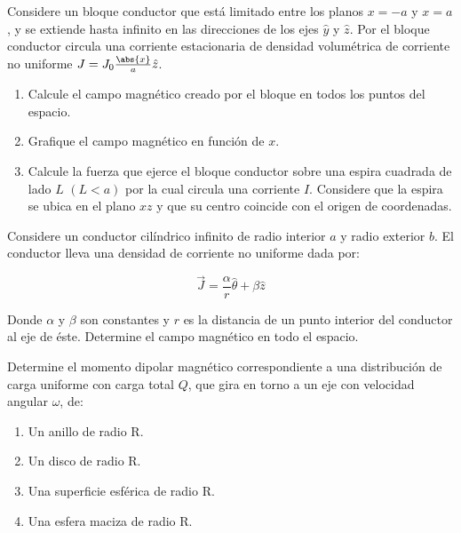 
\bigbreak

\np 
Considere un bloque conductor que está limitado entre los planos $x = -a$ y $x = a$, y se extiende hasta inﬁnito en las direcciones de los ejes $\hat{y}$ y $\hat{z}$. Por el bloque conductor circula una corriente estacionaria de densidad volumétrica de corriente no uniforme $J = J_0\frac{\abs{x}}{a}\hat{z}$.

\begin{enumerate}[label=\alph*)]
	\item Calcule el campo magnético creado por el bloque en todos los puntos del espacio.

	\item Graﬁque el campo magnético en función de $x$.

	\item Calcule la fuerza que ejerce el bloque conductor sobre una espira cuadrada de lado $L$ $(L < a)$ por la cual circula una corriente $I$. Considere que la espira se ubica en el plano $xz$ y que su centro coincide con el origen de coordenadas.
\end{enumerate}

\newpage

\np
Considere un conductor cilíndrico inﬁnito de radio interior $a$ y radio exterior $b$. El conductor lleva una densidad de corriente no uniforme dada por:

\[\vec{J} = \frac{\alpha}{r}\hat{\theta}+\beta\hat{z}\]

Donde $\alpha$ y $\beta$ son constantes y $r$ es la distancia de un punto interior del conductor al eje de éste. Determine el campo magnético en todo el espacio.



\np
Determine el momento dipolar magnético correspondiente a una distribución de carga uniforme con carga total $Q$, que gira en torno a un eje con velocidad angular $\omega$, de:

\begin{enumerate}[label=\alph*)]
	\item Un anillo de radio R.
	\item Un disco de radio R.
	\item Una superficie esférica de radio R.
	\item Una esfera maciza de radio R.
\end{enumerate}

